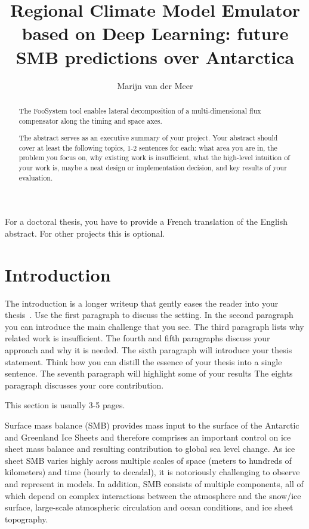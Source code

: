 \documentclass[a4paper,11pt,oneside]{report}
\title{Regional Climate Model Emulator based on Deep Learning: future SMB predictions over Antarctica}
\author{Marijn van der Meer}
\newcommand{\sysname}{FooSystem\xspace}
\begin{document}
\maketitle
\makededication
\makeacks

\begin{abstract}
The \sysname tool enables lateral decomposition of a multi-dimensional
flux compensator along the timing and space axes.

The abstract serves as an executive summary of your project.
Your abstract should cover at least the following topics, 1-2 sentences for
each: what area you are in, the problem you focus on, why existing work is
insufficient, what the high-level intuition of your work is, maybe a neat
design or implementation decision, and key results of your evaluation.
\end{abstract}

\begin{frenchabstract}
For a doctoral thesis, you have to provide a French translation of the
English abstract. For other projects this is optional.
\end{frenchabstract}

\maketoc

\chapter{Introduction}

The introduction is a longer writeup that gently eases the reader into your
thesis~\cite{dinesh20oakland}. Use the first paragraph to discuss the setting.
In the second paragraph you can introduce the main challenge that you see.
The third paragraph lists why related work is insufficient.
The fourth and fifth paragraphs discuss your approach and why it is needed.
The sixth paragraph will introduce your thesis statement. Think how you can
distill the essence of your thesis into a single sentence.
The seventh paragraph will highlight some of your results
The eights paragraph discusses your core contribution.

This section is usually 3-5 pages.

Surface mass balance (SMB) provides mass input to the surface of the Antarctic and Greenland Ice Sheets and therefore comprises an important control on ice sheet mass balance and resulting contribution to global sea level change. As ice sheet SMB varies highly across multiple scales of space (meters to hundreds of kilometers) and time (hourly to decadal), it is notoriously challenging to observe and represent in models. In addition, SMB consists of multiple components, all of which depend on complex interactions between the atmosphere and the snow/ice surface, large-scale atmospheric circulation and ocean conditions, and ice sheet topography.~\cite{Lenaerts}
\end{document}
